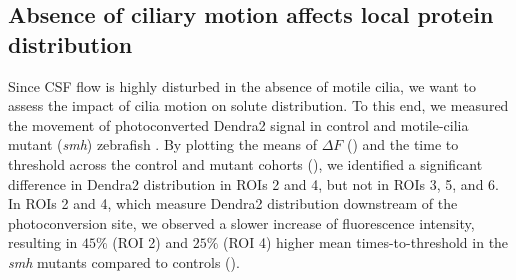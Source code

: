 \documentclass{WileyMSP-template}
\begin{document}

\subsection{Absence of ciliary motion affects local protein distribution}
Since CSF flow is highly disturbed in the absence of motile cilia, we
want to assess the impact of cilia motion on solute distribution. To this end,
we measured the movement of photoconverted Dendra2 signal
in control and motile-cilia mutant (\emph{smh}) zebrafish .
By plotting the means of $\Delta F$ ()
and the time to threshold
across the control and mutant cohorts (),
we identified a significant
difference in Dendra2 distribution in ROIs 2 and 4, but not in ROIs 3, 5, and 6. In ROIs 2 and 4,
which measure Dendra2 distribution downstream of the photoconversion site,
we observed a slower increase of fluorescence intensity,
resulting in $45\%$ (ROI 2) and $25\%$ (ROI 4)
higher mean times-to-threshold in the \emph{smh}
mutants compared to controls (). 
\end{document}
